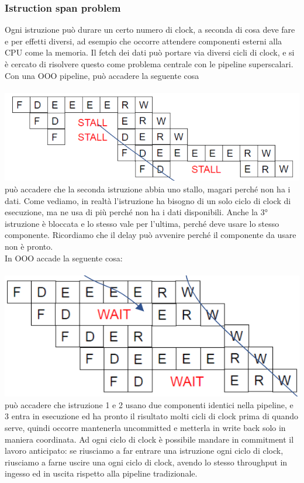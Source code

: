 \documentclass[14pt]{article}
\begin{document}
\subsubsection{Istruction span problem}
Ogni istruzione può durare un certo numero di clock, a seconda di cosa deve fare e per effetti diversi, ad esempio che occorre attendere componenti esterni alla CPU come la memoria. Il fetch dei dati può portare via diversi cicli di clock, e si è cercato di risolvere questo come problema centrale con le pipeline superscalari.\\ Con una OOO pipeline, può accadere la seguente cosa\\\\
\includegraphics[scale=0.5]{immagini/ooo-pipeline-1}\\
può accadere che la seconda istruzione abbia uno stallo, magari perché non ha i dati. Come vediamo, in realtà l'istruzione ha bisogno di un solo ciclo di clock di esecuzione, ma ne usa di più perché non ha i dati disponibili. Anche la 3° istruzione è bloccata e lo stesso vale per l'ultima, perché deve usare lo stesso componente. Ricordiamo che il delay può avvenire perché il componente da usare non è pronto.\\ In OOO accade la seguente cosa:\\\\
\includegraphics[scale=0.5]{immagini/ooo-pipeline-2}\\
può accadere che istruzione 1 e 2 usano due componenti identici nella pipeline, e 3 entra in esecuzione ed ha pronto il risultato molti cicli di clock prima di quando serve, quindi occorre mantenerla uncommitted e metterla in write back solo in maniera coordinata. Ad ogni ciclo di clock è possibile mandare in commitment il lavoro anticipato: se riusciamo a far entrare una istruzione ogni ciclo di clock, riusciamo a farne uscire una ogni ciclo di clock, avendo lo stesso throughput in ingesso ed in uscita rispetto alla pipeline tradizionale.
\end{document}

